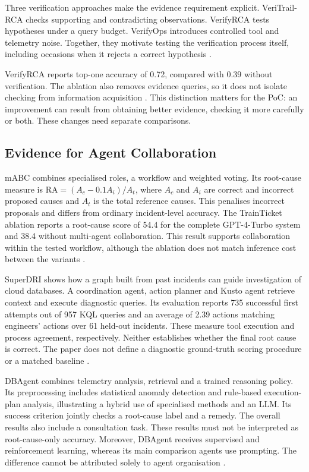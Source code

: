 Three verification approaches make the evidence requirement explicit.
VeriTrail-RCA checks supporting and contradicting observations. VerifyRCA
tests hypotheses under a query budget. VerifyOps introduces controlled
tool and telemetry noise. Together, they motivate testing the verification
process itself, including occasions when it rejects a correct hypothesis
\parencite{hu2026veritrail,ma2026verifyrca,ren2026verifyops}.

VerifyRCA reports top-one accuracy of 0.72, compared with 0.39 without
verification. The ablation also removes evidence queries, so it does not
isolate checking from information acquisition
\parencite[Table~I]{ma2026verifyrca}. This distinction matters for the PoC:
an improvement can result from obtaining better evidence, checking it more
carefully or both. These changes need separate comparisons.

\subsection{Evidence for Agent Collaboration}

mABC combines specialised roles, a workflow and weighted voting. Its
root-cause measure is $\mathrm{RA}=(A_c-0.1A_i)/A_t$, where $A_c$ and $A_i$
are correct and incorrect proposed causes and $A_t$ is the total reference
causes. This penalises incorrect proposals and differs from ordinary
incident-level accuracy. The TrainTicket ablation reports a root-cause
score of 54.4 for the complete GPT-4-Turbo system and 38.4 without
multi-agent collaboration. This result supports collaboration within the
tested workflow, although the ablation does not match inference cost
between the variants \parencite[Section~3.2, Table~7]{zhang2024mabc}.

SuperDRI shows how a graph built from past incidents can guide investigation
of cloud databases. A coordination agent, action planner and Kusto agent
retrieve context and execute diagnostic queries. Its evaluation reports
735 successful first attempts out of 957 KQL queries and an average of
2.39 actions matching engineers' actions over 61 held-out incidents.
These measure tool execution and process agreement, respectively. Neither
establishes whether the final root cause is correct. The paper does not
define a diagnostic ground-truth scoring procedure or a matched baseline
\parencite[Section~2.2, Figure~2, Table~1]{zhu2026superdri}.

DBAgent combines telemetry analysis, retrieval and a trained reasoning
policy. Its preprocessing includes statistical anomaly detection and
rule-based execution-plan analysis, illustrating a hybrid use of specialised
methods and an LLM. Its success criterion jointly checks a root-cause label
and a remedy. The overall results also include a consultation task. These
results must not be interpreted as root-cause-only accuracy. Moreover,
DBAgent receives supervised and reinforcement learning, whereas its main
comparison agents use prompting. The difference cannot be attributed
solely to agent organisation \parencite[Sections~4--6]{chen2026dbagent}.

